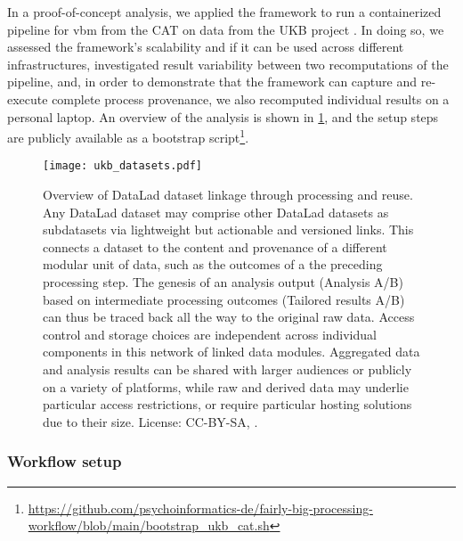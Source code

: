 In a proof-of-concept analysis, we applied the framework to run a containerized pipeline for \gls{vbm} \citep{ashburner2000voxel} from the \gls{CAT} \citep{gaser} on data from the UKB project \citep[][comprising 76 TB in 43 million files under strict usage constraints]{matthews2015uk}.
In doing so, we assessed the framework's scalability and if it can be used across different infrastructures, investigated result variability between two recomputations of the pipeline, and, in order to demonstrate that the framework can capture and re-execute complete process provenance, we also recomputed individual results on a personal laptop.
An overview of the analysis is shown in \cref{fig:fairly_datasets}, and the setup steps are publicly available as a bootstrap script\footnote{\url{https://github.com/psychoinformatics-de/fairly-big-processing-workflow/blob/main/bootstrap_ukb_cat.sh}}.

\begin{figure}
	\centering
	\texttt{[image: ukb\_datasets.pdf]}
	\caption[FAIRly big: Overview of the proof-of-concept analysis]{Overview of DataLad dataset linkage through processing and reuse. Any DataLad dataset may comprise other DataLad datasets as subdatasets via lightweight but actionable and versioned links. This connects a dataset to the content and provenance of a different modular unit of data, such as the outcomes of a the preceding processing step. The genesis of an analysis output (Analysis A/B) based on intermediate processing outcomes (Tailored results A/B) can thus be traced back all the way to the original raw data. Access control and storage choices are independent across individual components in this network of linked data modules. Aggregated data and analysis results can be shared with larger audiences or publicly on a variety of platforms, while raw and derived data may underlie particular access restrictions, or require particular hosting solutions due to their size. License: CC-BY-SA, \citet{wagner2022fairly}.}
	\label{fig:fairly_datasets}
\end{figure}

\subsubsection{Workflow setup}

